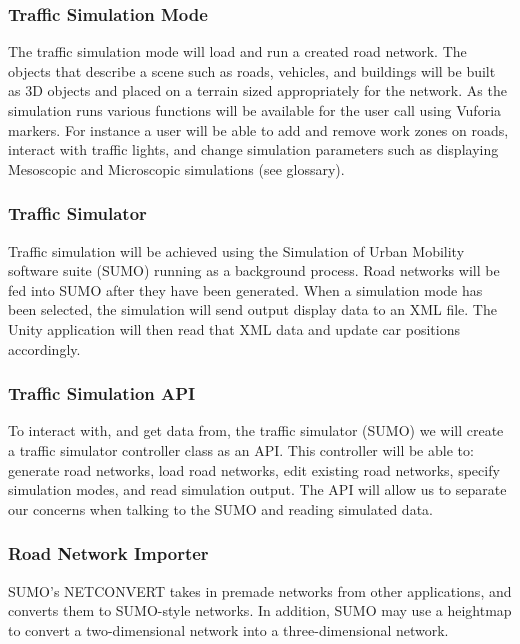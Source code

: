 \documentclass[letterpaper, 10pt, onecolumn, draftclsnofoot]{IEEEtran}
\begin{document}
        \subsubsection{Traffic Simulation Mode}
            The traffic simulation mode will load and run a created road network. The objects that describe a scene such as roads, vehicles, and buildings will be built as 3D objects and placed on a terrain sized appropriately for the network. As the simulation runs various functions will be available for the user call using Vuforia markers. For instance a user will be able to add and remove work zones on roads, interact with traffic lights, and change simulation parameters such as displaying Mesoscopic and Microscopic simulations (see glossary).  
        
        \subsubsection{Traffic Simulator}
            Traffic simulation will be achieved using the Simulation of Urban Mobility software suite (SUMO) running as a background process. Road networks will be fed into SUMO after they have been generated. When a simulation mode has been selected, the simulation will send output display data to an XML file. The Unity application will then read that XML data and update car positions accordingly.
       
        \subsubsection{Traffic Simulation API}
            To interact with, and get data from, the traffic simulator (SUMO) we will create a traffic simulator controller class as an API. This controller will be able to: generate road networks, load road networks, edit existing road networks, specify simulation modes, and read simulation output. The API will allow us to separate our concerns when talking to the SUMO and reading simulated data.
       
        \subsubsection{Road Network Importer}
            SUMO's NETCONVERT takes in premade networks from other applications, and converts them to SUMO-style networks\cite{SUMO}. In addition, SUMO may use a heightmap to convert a two-dimensional network into a three-dimensional network. 
       
\end{document}
